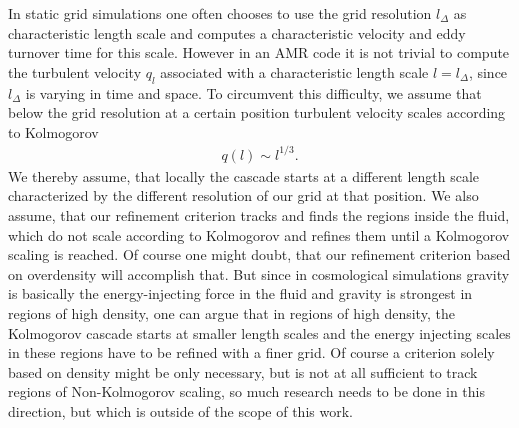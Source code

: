 In static grid simulations one often chooses to use the grid resolution
$l_{\Delta}$ as characteristic length scale and computes a characteristic
velocity and eddy turnover time for this scale. However in an AMR code it is not
trivial to compute the turbulent velocity $q_l$ associated with a characteristic
length scale $l = l_{\Delta}$, since $l_{\Delta}$ is varying in time and space.
To circumvent this difficulty, we assume that below the grid resolution at a
certain position turbulent velocity scales according to Kolmogorov
\begin{align}
q(l) \sim l^{1/3}.
\end{align}
We thereby assume, that locally the cascade starts at a different length scale
characterized by the different resolution of our grid at that position. We also
assume, that our refinement criterion tracks and finds the regions inside the
fluid, which do not scale according to Kolmogorov and refines them until a
Kolmogorov scaling is reached. Of course one might doubt, that our refinement
criterion based on overdensity will accomplish that. But since in cosmological
simulations gravity is basically the energy-injecting force in the fluid and
gravity is strongest in regions of high density, one can argue that in regions
of high density, the Kolmogorov cascade starts at smaller length scales and
the energy injecting scales in these regions have to be refined with a finer
grid. Of course a criterion solely based on density might be only necessary,
but is not at all sufficient to track regions of Non-Kolmogorov scaling, so
much research needs to be done in this direction, but which is outside of the 
scope of this work. 

